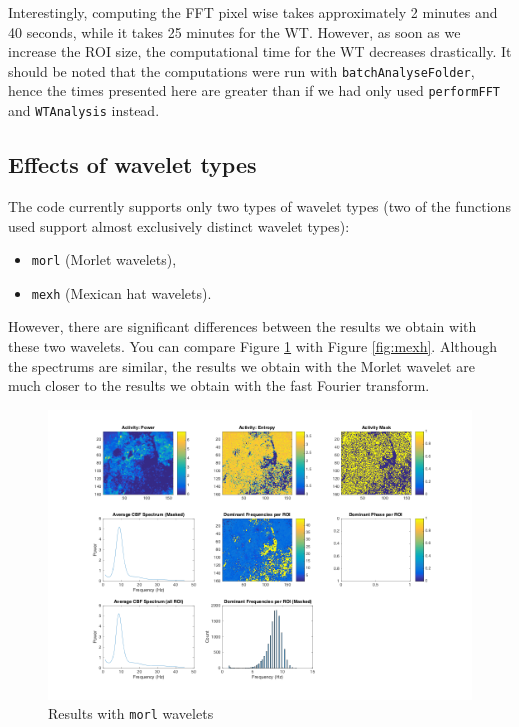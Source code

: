\documentclass[11pt]{scrartcl}
\begin{document}
Interestingly, computing the FFT pixel wise takes approximately 2 minutes and 40 seconds, while it takes 25
minutes for the WT. However, as soon as we increase the ROI size, the computational time for the WT decreases
drastically. It should be noted that the computations were run with \texttt{batchAnalyseFolder}, hence the
times presented here are greater than if we had only used \texttt{performFFT} and \texttt{WTAnalysis} instead.

\subsection{Effects of wavelet types}
\label{sec:effects-wavel-types}

The code currently supports only two types of wavelet types (two of the functions used support almost
exclusively distinct wavelet types):
\begin{itemize}
\item \texttt{morl} (Morlet wavelets),

\item \texttt{mexh} (Mexican hat wavelets).
\end{itemize}

However, there are significant differences between the results we obtain with these two wavelets. You can
compare Figure \ref{fig:morl} with Figure \ref{fig:mexh}. Although the spectrums are similar, the results we obtain with the Morlet wavelet are much
closer to the results we obtain with the fast Fourier transform.

\begin{figure}[h]
  \centering
  \includegraphics[scale=0.5]{Cylia_beating_movie_mat_Results.png}
  \caption{Results with \texttt{morl} wavelets}
  \label{fig:morl}
\end{figure}
\end{document}
